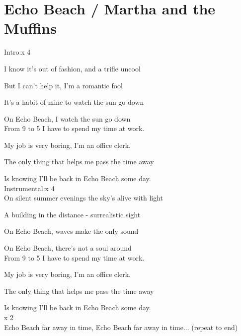 \section{Echo Beach / Martha and the Muffins}\label{sec:echo_beach}
\Cmajor
\Dmajor
\Fmajor
\Gmajor
\Aminor
\Eminor
\Bflat

Intro:\hrulefill{}\hrulefill{}\hrulefill{}\hrulefill{}\hrulefill x 4

I know it's out of fashion, and a trifle uncool\hrulefill{}\hrulefill

But I can't help it, I'm a romantic fool\hrulefill{}\hrulefill

It's a habit of mine to watch the sun go down\hrulefill

On Echo Beach, I watch the sun go down\hrulefill{}\hrulefill\\

From 9 to 5 I have to spend my time at work.

My job is very boring, I'm an office clerk.

The only thing that helps me pass the time away

Is knowing I'll be back in Echo Beach some day.\\

Instrumental:\hrulefill{}\hrulefill{}\hrulefill{}\hrulefill{}\hrulefill x 4\\

On silent summer evenings the sky's alive with light\hrulefill{}\hrulefill

A building in the distance - surrealistic sight\hrulefill

On Echo Beach, waves make the only sound\hrulefill

On Echo Beach, there's not a soul around\hrulefill{}\hrulefill\\

From 9 to 5 I have to spend my time at work.

My job is very boring, I'm an office clerk.

The only thing that helps me pass the time away

Is knowing I'll be back in Echo Beach some day.\\

\hrulefill{}\hrulefill{}\hrulefill{}\hrulefill x 2\\

Echo Beach far away in time, Echo Beach far away in time...
(repeat to end)